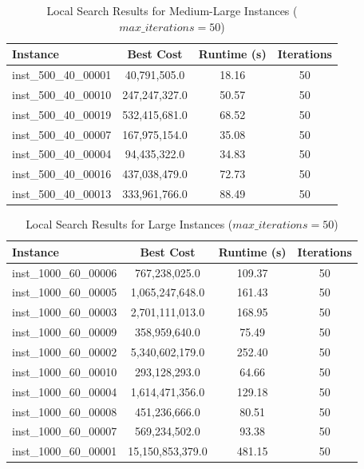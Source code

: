 \documentclass{article}
\begin{document}
\begin{table}[H]
\centering
\caption{Local Search Results for Medium-Large Instances ($max\_iterations = 50$)}
\begin{tabular}{lccc}
\toprule
\textbf{Instance} & \textbf{Best Cost} & \textbf{Runtime (s)} & \textbf{Iterations} \\
\midrule
inst\_500\_40\_00001 & 40,791,505.0  & 18.16 & 50 \\
inst\_500\_40\_00010 & 247,247,327.0 & 50.57 & 50 \\
inst\_500\_40\_00019 & 532,415,681.0 & 68.52 & 50 \\
inst\_500\_40\_00007 & 167,975,154.0 & 35.08 & 50 \\
inst\_500\_40\_00004 & 94,435,322.0  & 34.83 & 50 \\
inst\_500\_40\_00016 & 437,038,479.0 & 72.73 & 50 \\
inst\_500\_40\_00013 & 333,961,766.0 & 88.49 & 50 \\
\bottomrule
\end{tabular}
\label{tab:local_search_results_500_40}
\end{table}


\begin{table}[H]
\centering
\caption{Local Search Results for Large Instances ($max\_iterations = 50$)}
\begin{tabular}{lccc}
\toprule
\textbf{Instance} & \textbf{Best Cost} & \textbf{Runtime (s)} & \textbf{Iterations} \\
\midrule
inst\_1000\_60\_00006 & 767,238,025.0  & 109.37 &  50 \\
inst\_1000\_60\_00005 & 1,065,247,648.0 & 161.43 & 50 \\
inst\_1000\_60\_00003 & 2,701,111,013.0 & 168.95 & 50 \\
inst\_1000\_60\_00009 & 358,959,640.0   & 75.49  & 50 \\
inst\_1000\_60\_00002 & 5,340,602,179.0 & 252.40 & 50 \\
inst\_1000\_60\_00010 & 293,128,293.0   & 64.66  & 50 \\
inst\_1000\_60\_00004 & 1,614,471,356.0 & 129.18 & 50 \\
inst\_1000\_60\_00008 & 451,236,666.0   & 80.51  & 50 \\
inst\_1000\_60\_00007 & 569,234,502.0   & 93.38  & 50 \\
inst\_1000\_60\_00001 & 15,150,853,379.0 & 481.15 & 50 \\
\bottomrule
\end{tabular}

\label{tab:local_search_instances}
\end{table}
\end{document}
